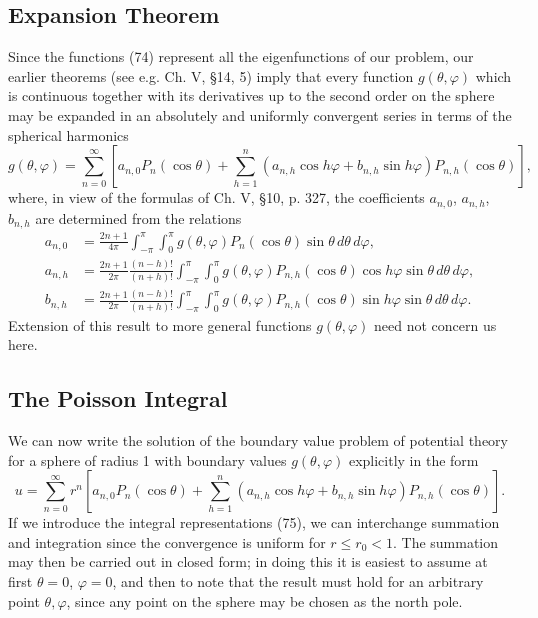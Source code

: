 \subsection{Expansion Theorem}
Since the functions (74) represent all the eigenfunctions of our problem, our earlier theorems (see e.g. Ch. V, \S14, 5) imply that every function $g(\theta,\varphi)$ which is continuous together with its derivatives up to the second order on the sphere may be expanded in an absolutely and uniformly convergent series in terms of the spherical harmonics
\[
g(\theta,\varphi)=\sum_{n=0}^{\infty}\left[a_{n,0}P_n(\cos\theta)
+\sum_{h=1}^{n}(a_{n,h}\cos h\varphi+b_{n,h}\sin h\varphi)P_{n,h}(\cos\theta)\right],
\]
where, in view of the formulas of Ch. V, \S10, p. 327, the coefficients $a_{n,0}$, $a_{n,h}$, $b_{n,h}$ are determined from the relations
\begin{equation}\tag{75}
\begin{aligned}
a_{n,0}&=\frac{2n+1}{4\pi}\int_{-\pi}^{\pi}\int_0^\pi
 g(\theta,\varphi)P_n(\cos\theta)\sin\theta\,d\theta\,d\varphi,\\
a_{n,h}&=\frac{2n+1}{2\pi}\frac{(n-h)!}{(n+h)!}
\int_{-\pi}^{\pi}\int_0^\pi g(\theta,\varphi)P_{n,h}(\cos\theta)\cos h\varphi\sin\theta\,d\theta\,d\varphi,\\
b_{n,h}&=\frac{2n+1}{2\pi}\frac{(n-h)!}{(n+h)!}
\int_{-\pi}^{\pi}\int_0^\pi g(\theta,\varphi)P_{n,h}(\cos\theta)\sin h\varphi\sin\theta\,d\theta\,d\varphi.
\end{aligned}
\end{equation}
Extension of this result to more general functions $g(\theta,\varphi)$ need not concern us here.

\subsection{The Poisson Integral}
We can now write the solution of the boundary value problem of potential theory for a sphere of radius 1 with boundary values $g(\theta,\varphi)$ explicitly in the form
\[
u=\sum_{n=0}^{\infty}r^n\left[a_{n,0}P_n(\cos\theta)
+\sum_{h=1}^{n}(a_{n,h}\cos h\varphi+b_{n,h}\sin h\varphi)P_{n,h}(\cos\theta)\right].
\]
If we introduce the integral representations (75), we can interchange summation and integration since the convergence is uniform for $r\le r_0<1$. The summation may then be carried out in closed form; in doing this it is easiest to assume at first $\theta=0$, $\varphi=0$, and then to note that the result must hold for an arbitrary point $\theta,\varphi$, since any point on the sphere may be chosen as the north pole.

